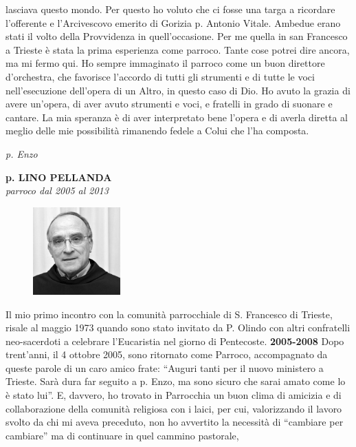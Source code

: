 lasciava questo mondo. Per questo ho voluto che ci fosse una targa a ricordare l’offerente e 
l’Arcivescovo emerito di Gorizia p. Antonio Vitale. Ambedue erano stati il volto della 
Provvidenza in quell’occasione.
\medbreak
Per me quella in san Francesco a Trieste è stata la prima esperienza come parroco. Tante cose 
potrei dire ancora, ma mi fermo qui. Ho sempre immaginato il parroco come un buon direttore 
d’orchestra, che favorisce l’accordo di tutti gli strumenti e di tutte le voci nell’esecuzione 
dell’opera di un Altro, in questo caso di Dio. Ho avuto la grazia di avere un’opera, di aver avuto 
strumenti e voci, e fratelli in grado di suonare e cantare. La mia speranza è di aver interpretato 
bene l’opera e di averla diretta al meglio delle mie possibilità rimanendo fedele a Colui che l’ha 
composta.
\begin{flushright}
\textit{p. Enzo}
\end{flushright}
\endgroup
\newpage
\begin{center}
\textbf{\Large p. LINO PELLANDA}\\
	\textit{parroco dal 2005 al 2013}
\end{center}
\bigbreak
\begingroup
\setlength\intextsep{0pt}
\begin{figure}
\centering
\includegraphics[width=0.3\textwidth]{immagini/lino.jpg}
\end{figure}
Il mio primo incontro con la comunità parrocchiale di S. Francesco di Trieste, risale al 
maggio 1973 quando sono stato invitato da P. Olindo con altri confratelli neo-sacerdoti a celebrare 
l'Eucaristia nel giorno di Pentecoste.
\bigbreak
\bigbreak
\textbf{2005-2008}
\medbreak
Dopo trent'anni, il 4 ottobre 2005, sono ritornato come Parroco, accompagnato da queste 
parole di un caro amico frate: ``Auguri tanti per il nuovo ministero a Trieste. Sarà dura far seguito a 
p. Enzo, ma sono sicuro che sarai amato come lo è stato lui''.
E, davvero, ho trovato in Parrocchia un buon clima di amicizia e di collaborazione della comunità 
religiosa con i laici, per cui, valorizzando il lavoro svolto da chi mi aveva preceduto, non ho 
avvertito la necessità di “cambiare per cambiare” ma di continuare in quel cammino pastorale, 
